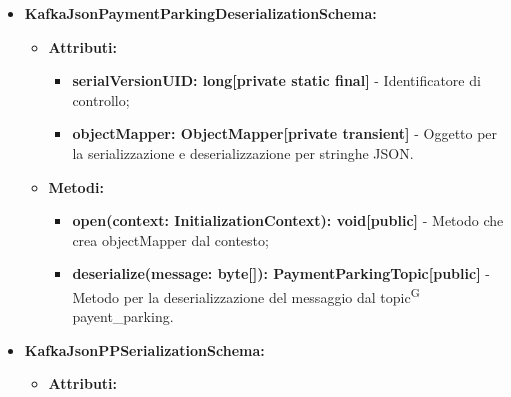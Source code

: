 \documentclass[8pt]{article}
\newcommand{\glossterm}[1]{#1\textsuperscript{G}} %
\begin{document}
\begin{itemize}
\begin{itemize}
    \end{itemize}
    \begin{itemize}
	\setlength\itemsep{0em}
        \item \textbf{Metodi:}
        \begin{itemize}
	\setlength\itemsep{0em}
            \item \textbf{open(context: InitializationContext): void[public]} - Metodo che crea objectMapper dal contesto;
            \item \textbf{deserialize(message: byte[]): ParkingTopic[public]} - Metodo per la deserializzazione del messaggio dal \glossterm{topic} parking.
        \end{itemize}
    \end{itemize}
    \item \textbf{KafkaJsonPaymentParkingDeserializationSchema:}
    \begin{itemize}
	\setlength\itemsep{0em}
        \item \textbf{Attributi:}
        \begin{itemize}
	\setlength\itemsep{0em}
            \item \textbf{serialVersionUID: long[private static final]} - Identificatore di controllo;
            \item \textbf{objectMapper: ObjectMapper[private transient]} - Oggetto per la serializzazione e deserializzazione per stringhe JSON.
        \end{itemize}
    \end{itemize}
    \begin{itemize}
	\setlength\itemsep{0em}
        \item \textbf{Metodi:}
        \begin{itemize}
	\setlength\itemsep{0em}
            \item \textbf{open(context: InitializationContext): void[public]} - Metodo che crea objectMapper dal contesto;
            \item \textbf{deserialize(message: byte[]): PaymentParkingTopic[public]} - Metodo per la deserializzazione del messaggio dal \glossterm{topic} payent\_parking.
        \end{itemize}
    \end{itemize}
    \item \textbf{KafkaJsonPPSerializationSchema:}
    \begin{itemize}
	\setlength\itemsep{0em}
        \item \textbf{Attributi:}
        \begin{itemize}

\end{itemize}
\end{itemize}
\end{itemize}
\end{document}
